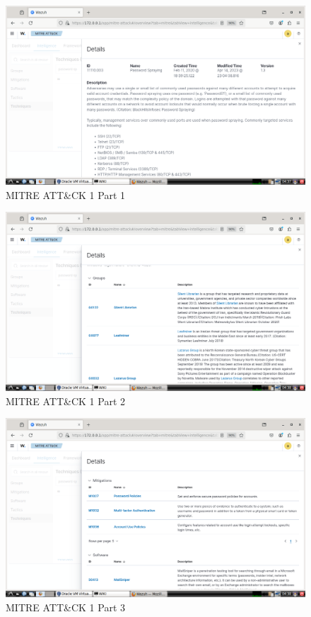 \documentclass[12pt,a4paper]{report}
\begin{document}
\begin{figure}[H]
\centering
\includegraphics[width=\textwidth]{ATTK 1 PIC 1.png}
\caption{MITRE ATT\&CK 1 Part 1}
\end{figure}
\begin{figure}[H]
\centering
\includegraphics[width=\textwidth]{ATTK 1 PIC 2.png}
\caption{MITRE ATT\&CK 1 Part 2}
\end{figure}
\begin{figure}[H]
\centering
\includegraphics[width=\textwidth]{ATTK 1 PIC 3.png}
\caption{MITRE ATT\&CK 1 Part 3}
\end{figure}
\end{document}
